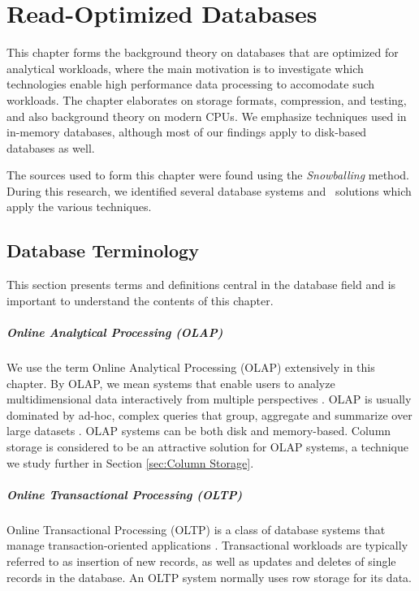 \chapter{Read-Optimized Databases}
\label{chap:olap}
This chapter forms the background theory on databases that are optimized for analytical workloads, where the main motivation is to investigate which technologies enable high performance data processing to accomodate such workloads. The chapter elaborates on storage formats, compression, and testing, and also background theory on modern CPUs. We emphasize techniques used in in-memory databases, although most of our findings apply to disk-based databases as well.

The sources used to form this chapter were found using the \textit{Snowballing} method. During this research, we identified several database systems and \bi~solutions which apply the various techniques. 


\clearpage

\section{Database Terminology}
\label{sec:Database Terminology}
This section presents terms and definitions central in the database field and is important to understand the contents of this chapter.

\paragraph{Online Analytical Processing (OLAP)}
\label{par:Online Analytical Processing (OLAP)}
  We use the term Online Analytical Processing (OLAP) extensively in this chapter. By OLAP, we mean systems that enable users to analyze multidimensional data interactively from multiple perspectives \cite{Wikipedia_contributors2015-hw}. OLAP is usually dominated by ad-hoc, complex queries that group, aggregate and summarize over large datasets \cite{Bjorklund2011-wh}. OLAP systems can be both disk and memory-based. Column storage is considered to be an attractive solution for OLAP systems, a technique we study further in Section \ref{sec:Column Storage}.


\paragraph{Online Transactional Processing (OLTP)}
\label{par:Online Transactional Processing (OLTP)}
Online Transactional Processing (OLTP) is a class of database systems that manage transaction-oriented applications \cite{Wikipedia_contributors2015-cw}. Transactional workloads are typically referred to as insertion of new records, as well as updates and deletes of single records in the database. An OLTP system normally uses row storage for its data.

